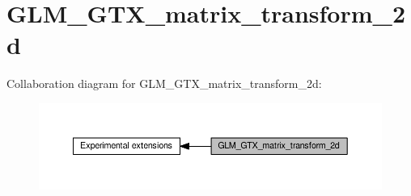 \hypertarget{group__gtx__matrix__transform__2d}{}\section{G\+L\+M\+\_\+\+G\+T\+X\+\_\+matrix\+\_\+transform\+\_\+2d}
\label{group__gtx__matrix__transform__2d}
Collaboration diagram for G\+L\+M\+\_\+\+G\+T\+X\+\_\+matrix\+\_\+transform\+\_\+2d\+:
\nopagebreak
\begin{figure}[H]
\begin{center}
\leavevmode
\includegraphics[width=350pt]{de/d60/group__gtx__matrix__transform__2d}
\end{center}
\end{figure}
